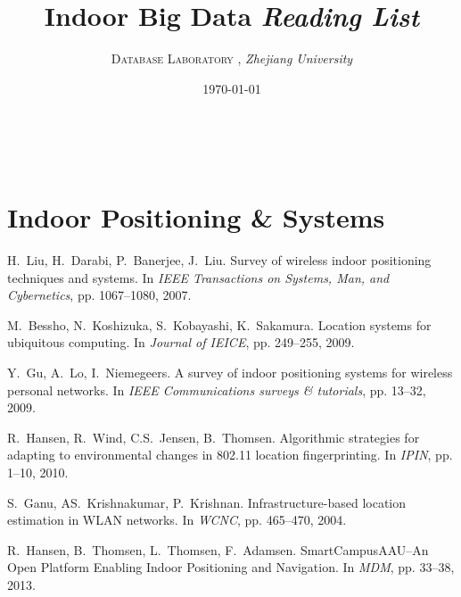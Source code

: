 \documentclass[a4paper, 11pt]{article} %
\title{Indoor Big Data \textit{Reading List}} %
\author{\textsc{Database Laboratory} %
, {\textit{Zhejiang University}}} %
\date{\today} %
\makeatletter
\renewcommand{\maketitle}{ %

\begin{flushright} %
{\LARGE\@title} %

\vspace{20pt} %

{\large\@author} %
\vspace{15pt}
\\\@date %

\vspace{20pt} %
\end{flushright}
}
\makeatother
\begin{document}
\maketitle %





\section{Indoor Positioning \& Systems}

\renewcommand{\refname}{}

\vspace{-25pt} %
\begin{thebibliography}{99}

H.~Liu, H.~Darabi, P.~Banerjee, J.~Liu.
\newblock Survey of wireless indoor positioning techniques and systems.
\newblock In {\em IEEE Transactions on Systems, Man, and Cybernetics}, pp. 1067--1080, 2007.

M.~Bessho, N.~Koshizuka, S.~Kobayashi, K.~Sakamura.
\newblock Location systems for ubiquitous computing.
\newblock In {\em Journal of IEICE}, pp. 249--255, 2009.

Y.~Gu, A.~Lo, I.~Niemegeers.
\newblock A survey of indoor positioning systems for wireless personal networks.
\newblock In {\em IEEE Communications surveys \& tutorials}, pp. 13--32, 2009.

R.~Hansen, R.~Wind, C.S.~Jensen, B.~Thomsen.
\newblock Algorithmic strategies for adapting to environmental changes in 802.11 location fingerprinting.
\newblock In {\em IPIN}, pp. 1--10, 2010.

S.~Ganu, AS.~Krishnakumar, P.~Krishnan.
\newblock Infrastructure-based location estimation in WLAN networks.
\newblock In {\em WCNC}, pp. 465--470, 2004.

R.~Hansen, B.~Thomsen, L.~Thomsen, F.~Adamsen.
\newblock SmartCampusAAU--An Open Platform Enabling Indoor Positioning and Navigation.
\newblock In {\em MDM}, pp. 33--38, 2013.

\end{thebibliography}
\end{document}
